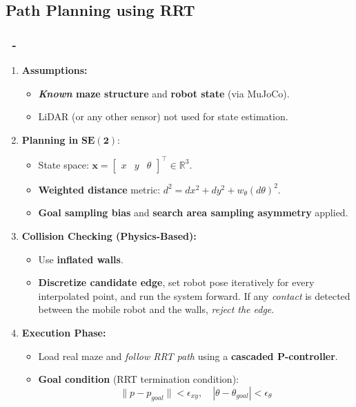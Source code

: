 \documentclass{beamer}
\begin{document}
\subsection{Path Planning using RRT}
\begin{frame}
    \frametitle{\insertsection \ - \insertsubsection}
    \begin{enumerate}
        \item \textbf{Assumptions:}
              \begin{itemize}
                  \item \textbf{\textit{Known} maze structure} and \textbf{robot state} (via MuJoCo).
                  \item LiDAR (or any other sensor) not used for state estimation.
              \end{itemize}
              \vspace{5pt}
        \item \textbf{Planning in} $\mathbf{SE(2)}$:
              \begin{itemize}
                  \item State space: $\mathbf{x} = \begin{bmatrix} x & y & \theta \end{bmatrix}^\top \in \mathbb{R}^{3}$.
                  \item \textbf{Weighted distance} metric: $d^2 = dx^2 + dy^2 + w_\theta(d\theta)^2$.
                  \item \textbf{Goal sampling bias} and \textbf{search area sampling asymmetry} applied.
              \end{itemize}
              \vspace{5pt}
        \item \textbf{Collision Checking (Physics-Based):}
              \begin{itemize}
                  \item Use \textbf{inflated walls}.
                  \item \textbf{Discretize candidate edge}, set robot pose iteratively for every interpolated point, and run the system forward. If any \textit{contact} is detected between the mobile robot and the walls, \textit{reject the edge}.
              \end{itemize}
              \vspace{5pt}
        \item \textbf{Execution Phase:}
              \begin{itemize}
                  \item Load real maze and \textit{follow RRT path} using a \textbf{cascaded P-controller}.
                  \item \textbf{Goal condition} (RRT termination condition):
                        \[
                            \|p - p_{goal}\| < \epsilon_{xy}, \quad
                            |\theta - \theta_{goal}| < \epsilon_\theta
                        \]
              \end{itemize}
    \end{enumerate}
\end{frame}
\end{document}
